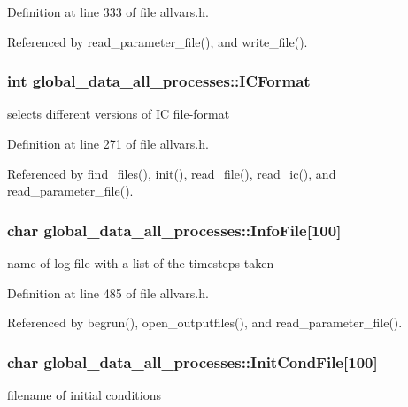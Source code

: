 Definition at line 333 of file allvars.h.



Referenced by read\_\-parameter\_\-file(), and write\_\-file().

\hypertarget{structglobal__data__all__processes_a1c63650e75378a527870ab40f1145df1}{
\subsubsection[{ICFormat}]{\setlength{\rightskip}{0pt plus 5cm}int {\bf global\_\-data\_\-all\_\-processes::ICFormat}}}
\label{structglobal__data__all__processes_a1c63650e75378a527870ab40f1145df1}
selects different versions of IC file-\/format 

Definition at line 271 of file allvars.h.



Referenced by find\_\-files(), init(), read\_\-file(), read\_\-ic(), and read\_\-parameter\_\-file().

\hypertarget{structglobal__data__all__processes_a3cbcdacb8b522288268993f0ce5b15ac}{
\subsubsection[{InfoFile}]{\setlength{\rightskip}{0pt plus 5cm}char {\bf global\_\-data\_\-all\_\-processes::InfoFile}\mbox{[}100\mbox{]}}}
\label{structglobal__data__all__processes_a3cbcdacb8b522288268993f0ce5b15ac}
name of log-\/file with a list of the timesteps taken 

Definition at line 485 of file allvars.h.



Referenced by begrun(), open\_\-outputfiles(), and read\_\-parameter\_\-file().

\hypertarget{structglobal__data__all__processes_adacd2b54a924bb4ce144afc1abbc6138}{
\subsubsection[{InitCondFile}]{\setlength{\rightskip}{0pt plus 5cm}char {\bf global\_\-data\_\-all\_\-processes::InitCondFile}\mbox{[}100\mbox{]}}}
\label{structglobal__data__all__processes_adacd2b54a924bb4ce144afc1abbc6138}
filename of initial conditions 

